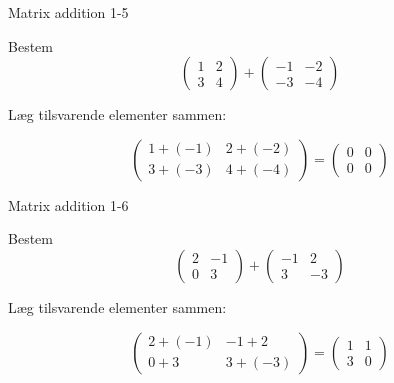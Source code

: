 \documentclass{article}
\begin{document}
\newpage

\begin{exercise}{Matrix addition 1-5}

Bestem
\[
\begin{pmatrix} 1 & 2 \\ 3 & 4 \end{pmatrix} + \begin{pmatrix} -1 & -2 \\ -3 & -4 \end{pmatrix}
\]


\hint

Læg tilsvarende elementer sammen:

\hint
\[
\begin{pmatrix} 1 + (-1) & 2 + (-2) \\ 3 + (-3) & 4 + (-4) \end{pmatrix} = \begin{pmatrix} 0 & 0 \\ 0 & 0 \end{pmatrix}
\]

\end{exercise}

\newpage

\begin{exercise}{Matrix addition 1-6}

Bestem
\[
\begin{pmatrix} 2 & -1 \\ 0 & 3 \end{pmatrix} + \begin{pmatrix} -1 & 2 \\ 3 & -3 \end{pmatrix}
\]


\hint

Læg tilsvarende elementer sammen:

\hint
\[
\begin{pmatrix} 2 + (-1) & -1 + 2 \\ 0 + 3 & 3 + (-3) \end{pmatrix} = \begin{pmatrix} 1 & 1 \\ 3 & 0 \end{pmatrix}
\]

\end{exercise}
\end{document}
